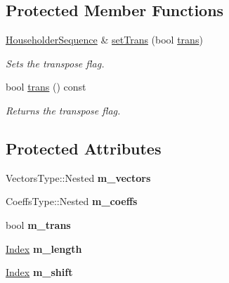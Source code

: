 \subsection*{Protected Member Functions}
\begin{DoxyCompactItemize}
\item 
\mbox{\hyperlink{class_eigen_1_1_householder_sequence}{Householder\+Sequence}} \& \mbox{\hyperlink{class_eigen_1_1_householder_sequence_ab8a9c969a9adcd392c9d481d6e9ccaef}{set\+Trans}} (bool \mbox{\hyperlink{class_eigen_1_1_householder_sequence_ad61c9b10d95c26b7397ccb47f4d80b08}{trans}})
\begin{DoxyCompactList}\small\item\em Sets the transpose flag. \end{DoxyCompactList}\item 
\mbox{\label{class_eigen_1_1_householder_sequence_ad61c9b10d95c26b7397ccb47f4d80b08}} 
bool \mbox{\hyperlink{class_eigen_1_1_householder_sequence_ad61c9b10d95c26b7397ccb47f4d80b08}{trans}} () const
\begin{DoxyCompactList}\small\item\em Returns the transpose flag. \end{DoxyCompactList}\end{DoxyCompactItemize}
\subsection*{Protected Attributes}
\begin{DoxyCompactItemize}
\item 
\mbox{\label{class_eigen_1_1_householder_sequence_a84224ecbb213a3a89bb1e7146b35dcc4}} 
Vectors\+Type\+::\+Nested {\bfseries m\+\_\+vectors}
\item 
\mbox{\label{class_eigen_1_1_householder_sequence_a6768687f4d9fc45c1bb00035d3db0bca}} 
Coeffs\+Type\+::\+Nested {\bfseries m\+\_\+coeffs}
\item 
\mbox{\label{class_eigen_1_1_householder_sequence_a168eb7aef51e7fdcc1370ac3d614d53b}} 
bool {\bfseries m\+\_\+trans}
\item 
\mbox{\label{class_eigen_1_1_householder_sequence_a1395b340f17bc21b445b114acad519f8}} 
\mbox{\hyperlink{struct_eigen_1_1_eigen_base_a554f30542cc2316add4b1ea0a492ff02}{Index}} {\bfseries m\+\_\+length}
\item 
\mbox{\label{class_eigen_1_1_householder_sequence_ac71c8da29363f79bb6ac246d46234363}} 
\mbox{\hyperlink{struct_eigen_1_1_eigen_base_a554f30542cc2316add4b1ea0a492ff02}{Index}} {\bfseries m\+\_\+shift}
\end{DoxyCompactItemize}

